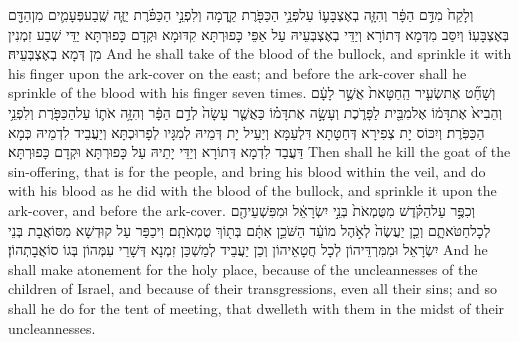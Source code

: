 {וְלָקַח֙ מִדַּ֣ם הַפָּ֔ר וְהִזָּ֧ה בְאֶצְבָּע֛וֹ עַל\maqqaf פְּנֵ֥י הַכַּפֹּ֖רֶת קֵ֑דְמָה וְלִפְנֵ֣י הַכַּפֹּ֗רֶת יַזֶּ֧ה שֶֽׁבַע\maqqaf פְּעָמִ֛ים מִן\maqqaf הַדָּ֖ם בְּאֶצְבָּעֽוֹ׃}
{וְיִסַּב מִדְּמָא דְּתוֹרָא וְיַדֵּי בְאֶצְבְּעֵיהּ עַל אַפֵּי כָּפוּרְתָּא קִדּוּמָא וּקְדָם כָּפוּרְתָּא יַדֵּי שְׁבַע זִמְנִין מִן דְּמָא בְאֶצְבְּעֵיהּ׃}
{And he shall take of the blood of the bullock, and sprinkle it with his finger upon the ark-cover on the east; and before the ark-cover shall he sprinkle of the blood with his finger seven times.}{}
{וְשָׁחַ֞ט אֶת\maqqaf שְׂעִ֤יר הַֽחַטָּאת֙ אֲשֶׁ֣ר לָעָ֔ם וְהֵבִיא֙ אֶת\maqqaf דָּמ֔וֹ אֶל\maqqaf מִבֵּ֖ית לַפָּרֹ֑כֶת וְעָשָׂ֣ה אֶת\maqqaf דָּמ֗וֹ כַּאֲשֶׁ֤ר עָשָׂה֙ לְדַ֣ם הַפָּ֔ר וְהִזָּ֥ה אֹת֛וֹ עַל\maqqaf הַכַּפֹּ֖רֶת וְלִפְנֵ֥י הַכַּפֹּֽרֶת׃}
{וְיִכּוֹס יָת צְפִירָא דְּחַטָּתָא דִּלְעַמָּא וְיַעֵיל יָת דְּמֵיהּ לְמִגָּיו לְפָרוּכְתָּא וְיַעֲבֵיד לִדְמֵיהּ כְּמָא דַּעֲבַד לִדְמָא דְּתוֹרָא וְיַדֵּי יָתֵיהּ עַל כָּפוּרְתָּא וּקְדָם כָּפוּרְתָּא׃}
{Then shall he kill the goat of the sin-offering, that is for the people, and bring his blood within the veil, and do with his blood as he did with the blood of the bullock, and sprinkle it upon the ark-cover, and before the ark-cover.}{}
{וְכִפֶּ֣ר עַל\maqqaf הַקֹּ֗דֶשׁ מִטֻּמְאֹת֙ בְּנֵ֣י יִשְׂרָאֵ֔ל וּמִפִּשְׁעֵיהֶ֖ם לְכׇל\maqqaf חַטֹּאתָ֑ם וְכֵ֤ן יַעֲשֶׂה֙ לְאֹ֣הֶל מוֹעֵ֔ד הַשֹּׁכֵ֣ן אִתָּ֔ם בְּת֖וֹךְ טֻמְאֹתָֽם׃}
{וִיכַפַּר עַל קוּדְשָׁא מִסּוֹאֲבָת בְּנֵי יִשְׂרָאֵל וּמִמִּרְדֵּיהוֹן לְכָל חֲטָאֵיהוֹן וְכֵן יַעֲבֵיד לְמַשְׁכַּן זִמְנָא דְּשָׁרֵי עִמְּהוֹן בְּגוֹ סוֹאֲבָתְהוֹן׃}
{And he shall make atonement for the holy place, because of the uncleannesses of the children of Israel, and because of their transgressions, even all their sins; and so shall he do for the tent of meeting, that dwelleth with them in the midst of their uncleannesses.}{}
